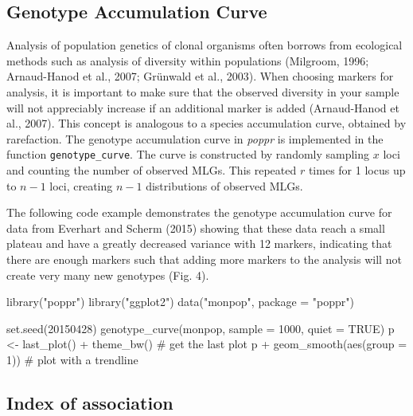 \documentclass{frontiersSCNS} %
\newenvironment{CodeChunk}{}{}
\begin{document}
\subsection*{Genotype Accumulation
Curve}\label{genotype-accumulation-curve}

Analysis of population genetics of clonal organisms often borrows from
ecological methods such as analysis of diversity within populations
(Milgroom, 1996; Arnaud-Hanod et al., 2007; Grünwald et al., 2003). When
choosing markers for analysis, it is important to make sure that the
observed diversity in your sample will not appreciably increase if an
additional marker is added (Arnaud-Hanod et al., 2007). This concept is
analogous to a species accumulation curve, obtained by rarefaction. The
genotype accumulation curve in \emph{poppr} is implemented in the
function \texttt{genotype\_curve}. The curve is constructed by randomly
sampling \(x\) loci and counting the number of observed MLGs. This
repeated \(r\) times for 1 locus up to \(n-1\) loci, creating \(n-1\)
distributions of observed MLGs.

The following code example demonstrates the genotype accumulation curve
for data from Everhart and Scherm (2015) showing that these data reach a
small plateau and have a greatly decreased variance with 12 markers,
indicating that there are enough markers such that adding more markers
to the analysis will not create very many new genotypes (Fig. 4).

\begin{CodeChunk}
\begin{CodeInput}
library("poppr")
library("ggplot2")
data("monpop", package = "poppr")

set.seed(20150428)
genotype_curve(monpop, sample = 1000, quiet = TRUE)
p <- last_plot() + theme_bw()   # get the last plot
p + geom_smooth(aes(group = 1)) # plot with a trendline
\end{CodeInput}
\end{CodeChunk}

\subsection*{Index of association}\label{index-of-association}
\end{document}
